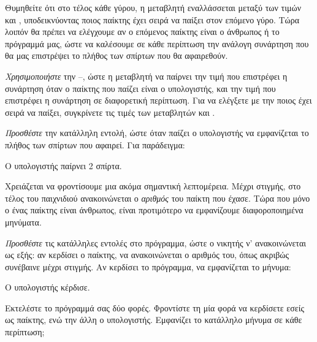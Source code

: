 \documentclass[a4paper,11pt,oneside]{book}
\begin{document}
\begin{step}
Θυμηθείτε ότι στο τέλος κάθε γύρου, η μεταβλητή  εναλλάσσεται μεταξύ των τιμών  και , υποδεικνύοντας ποιος παίκτης έχει σειρά να παίξει στον επόμενο γύρο. Τώρα λοιπόν θα πρέπει να ελέγχουμε αν ο επόμενος παίκτης είναι ο άνθρωπος ή το πρόγραμμά μας, ώστε να καλέσουμε σε κάθε περίπτωση την ανάλογη συνάρτηση που θα μας επιστρέψει το πλήθος των σπίρτων που θα αφαιρεθούν.

\emph{Χρησιμοποιήστε} την --, ώστε η μεταβλητή  να παίρνει την τιμή που επιστρέφει η συνάρτηση  όταν ο παίκτης που παίζει είναι ο υπολογιστής, και την τιμή που επιστρέφει η συνάρτηση  σε διαφορετική περίπτωση. 
Για να ελέγξετε με την  ποιος έχει σειρά να παίξει, συγκρίνετε τις τιμές των μεταβλητών  και .
\end{step}

\begin{step}
\emph{Προσθέστε} την κατάλληλη εντολή, ώστε όταν παίζει ο υπολογιστής να εμφανίζεται το πλήθος των σπίρτων που αφαιρεί. Για παράδειγμα:

\marginnote[14pt]{\iconcomputer}
\begin{pyterm}
Ο υπολογιστής παίρνει 2 σπίρτα.
\end{pyterm}
\end{step}

\begin{step}
Χρειάζεται να φροντίσουμε μια ακόμα σημαντική λεπτομέρεια. Μέχρι στιγμής, στο τέλος του παιχνιδιού ανακοινώνεται ο \emph{αριθμός} του παίκτη που έχασε. Τώρα που μόνο ο ένας παίκτης είναι άνθρωπος, είναι προτιμότερο να εμφανίζουμε διαφοροποιημένα μηνύματα.

\emph{Προσθέστε} τις κατάλληλες εντολές στο πρόγραμμα, ώστε ο νικητής ν' ανακοινώνεται ως εξής: αν κερδίσει ο παίκτης, να ανακοινώνεται ο αριθμός του, όπως ακριβώς συνέβαινε μέχρι στιγμής. Αν κερδίσει το πρόγραμμα, να εμφανίζεται το μήνυμα:

\marginnote[14pt]{\iconcomputer}
\begin{pyterm}
Ο υπολογιστής κέρδισε.
\end{pyterm}

Εκτελέστε το πρόγραμμά σας δύο φορές. Φροντίστε τη μία φορά να κερδίσετε εσείς ως παίκτης, ενώ την άλλη ο υπολογιστής. Εμφανίζει το κατάλληλο μήνυμα σε κάθε περίπτωση;

\clearpage
\marginnote[14pt]{\icondiscuss}
\vspace{-8pt}
\dottedline

\dottedline
\end{step}
\end{document}
